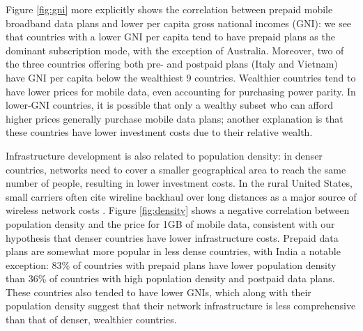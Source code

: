 Figure \ref{fig:gni} more explicitly shows the correlation between prepaid mobile broadband data plans and lower per capita gross national incomes (GNI): we see that countries with a lower GNI per capita tend to have prepaid plans as the dominant subscription mode, with the exception of Australia.  Moreover, two of the three countries offering both pre- and postpaid plans (Italy and Vietnam) have GNI per capita below the wealthiest 9 countries. Wealthier countries tend to have lower prices for mobile data, even accounting for purchasing power parity. In lower-GNI countries, it is possible that only a wealthy subset who can afford higher prices generally purchase mobile data plans; another explanation is that these countries have lower investment costs due to their relative wealth.

Infrastructure development is also related to population density: in denser countries, networks need to cover a smaller geographical area to reach the same number of people, resulting in lower investment costs. In the rural United States, small carriers often cite wireline backhaul over long distances as a major source of wireless network costs \cite{neca}. Figure \ref{fig:density} shows a negative correlation between population density and the price for 1GB of mobile data, consistent with our hypothesis that denser countries have lower infrastructure costs. Prepaid data plans are somewhat more popular in less dense countries, with India a notable exception: 83\% of countries with prepaid plans have lower population density than 36\% of countries with high population density and postpaid data plans. These countries also tended to have lower GNIs, which along with their population density suggest that their network infrastructure is less comprehensive than that of denser, wealthier countries.


%
